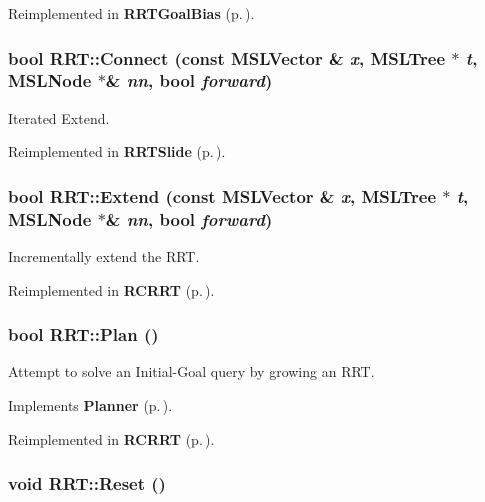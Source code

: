 Reimplemented in {\bf RRTGoal\-Bias} {\rm (p.\,\pageref{classRRTGoalBias_b0})}.
\subsubsection{\setlength{\rightskip}{0pt plus 5cm}bool RRT::Connect (const {\bf MSLVector} \& {\em x}, {\bf MSLTree} $\ast$ {\em t}, {\bf MSLNode} $\ast$\& {\em nn}, bool {\em forward})\hspace{0.3cm}{\tt  [protected, virtual]}}\label{classRRT_b3}


Iterated Extend.



Reimplemented in {\bf RRTSlide} {\rm (p.\,\pageref{classRRTSlide_a3})}.
\subsubsection{\setlength{\rightskip}{0pt plus 5cm}bool RRT::Extend (const {\bf MSLVector} \& {\em x}, {\bf MSLTree} $\ast$ {\em t}, {\bf MSLNode} $\ast$\& {\em nn}, bool {\em forward})\hspace{0.3cm}{\tt  [protected, virtual]}}\label{classRRT_b2}


Incrementally extend the RRT.



Reimplemented in {\bf RCRRT} {\rm (p.\,\pageref{classRCRRT_a7})}.
\subsubsection{\setlength{\rightskip}{0pt plus 5cm}bool RRT::Plan ()\hspace{0.3cm}{\tt  [virtual]}}\label{classRRT_a3}


Attempt to solve an Initial-Goal query by growing an RRT.



Implements {\bf Planner} {\rm (p.\,\pageref{classPlanner_a4})}.

Reimplemented in {\bf RCRRT} {\rm (p.\,\pageref{classRCRRT_a10})}.
\subsubsection{\setlength{\rightskip}{0pt plus 5cm}void RRT::Reset ()\hspace{0.3cm}{\tt  [virtual]}}\label{classRRT_a2}


